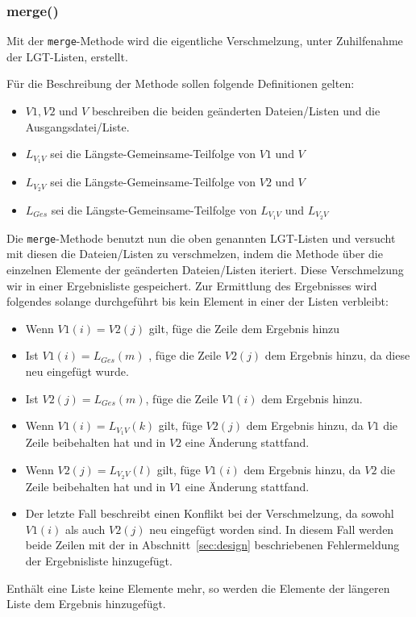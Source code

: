 \documentclass[a4paper,titlepage,12pt]{scrartcl}
\begin{document}
\subsubsection{merge()}
\label{sec:merge}
Mit der \texttt{merge}-Methode wird die eigentliche Verschmelzung, unter Zuhilfenahme der LGT-Listen, erstellt.

Für die Beschreibung der Methode sollen folgende Definitionen gelten:
\begin{itemize}
\item $V1 , V2$ und $V$ beschreiben die beiden geänderten Dateien/Listen und die Ausgangsdatei/Liste.
\item $L_{V_{1}V}$ sei die Längste-Gemeinsame-Teilfolge von $V1$ und $V$
\item $L_{V_{2}V}$ sei die Längste-Gemeinsame-Teilfolge von $V2$ und $V$
\item $L_{Ges}$ sei die Längste-Gemeinsame-Teilfolge von $L_{V_{1}V}$ und $L_{V_{2}V}$
\end{itemize}

Die \texttt{merge}-Methode benutzt nun die oben genannten LGT-Listen und versucht mit diesen die Dateien/Listen zu verschmelzen,
indem die Methode über die einzelnen Elemente der geänderten Dateien/Listen iteriert. Diese Verschmelzung wir in einer Ergebnisliste gespeichert.
Zur Ermittlung des Ergebnisses wird folgendes solange durchgeführt bis kein Element in einer der Listen verbleibt:
\begin{itemize}
\item Wenn $V1(i) = V2(j)$ gilt, füge die Zeile dem Ergebnis hinzu
\item Ist $V1(i) = L_{Ges}(m)$ , füge die Zeile $V2(j)$ dem Ergebnis hinzu, da diese neu eingefügt wurde.
\item Ist $V2(j) = L_{Ges}(m)$, füge die Zeile $V1(i)$ dem Ergebnis hinzu.
\item Wenn $V1(i) = L_{V_{1}V}(k)$ gilt, füge $V2(j)$ dem Ergebnis hinzu, da $V1$ die Zeile beibehalten hat und in $V2$ eine Änderung stattfand.
\item Wenn $V2(j) = L_{V_{2}V}(l)$ gilt, füge $V1(i)$ dem Ergebnis hinzu, da $V2$ die Zeile beibehalten hat und in $V1$ eine Änderung stattfand.
\item Der letzte Fall beschreibt einen Konflikt bei der Verschmelzung, da sowohl $V1(i)$ als auch $V2(j)$ neu eingefügt worden sind. In diesem Fall werden beide Zeilen mit der in Abschnitt~\ref{sec:design} beschriebenen Fehlermeldung der Ergebnisliste hinzugefügt.
\end{itemize}
Enthält eine Liste keine Elemente mehr, so werden die Elemente der längeren Liste dem Ergebnis hinzugefügt.
\end{document}
